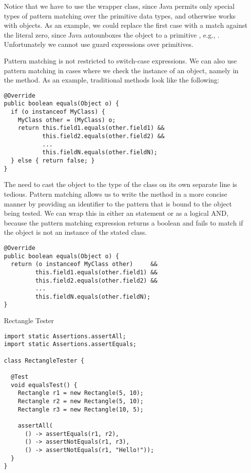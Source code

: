 Notice that we have to use the wrapper class, since Java permits only special types of pattern matching over the primitive data types, and otherwise works with objects. As an example, we could replace the first case with a match against the literal zero, since Java autounboxes the  object to a primitive , e.g., . Unfortunately we cannot use guard expressions over primitives.

Pattern matching is not restricted to switch-case expressions. We can also use pattern matching in cases where we check the instance of an object, namely in the  method. As an example, traditional  methods look like the following:

\par{
\begin{verbatim}
@Override
public boolean equals(Object o) {
  if (o instanceof MyClass) {
    MyClass other = (MyClass) o;
    return this.field1.equals(other.field1) &&
           this.field2.equals(other.field2) &&
           ...
           this.fieldN.equals(other.fieldN);
  } else { return false; }
}
\end{verbatim}
}

The need to cast the object to the type of the class on its own separate line is tedious. Pattern matching allows us to write the  method in a more concise manner by providing an identifier to the pattern that is bound to the object being tested. We can wrap this in either an  statement or as a logical AND, because the pattern matching expression returns a boolean and fails to match if the object is not an instance of the stated class.

\par{
\begin{verbatim}
@Override
public boolean equals(Object o) {
  return (o instanceof MyClass other)     &&
         this.field1.equals(other.field1) &&
         this.field2.equals(other.field2) &&
         ...
         this.fieldN.equals(other.fieldN);
}
\end{verbatim}
}


\begin{cl}{Rectangle Tester}
\begin{lstlisting}[language=MyJava]
import static Assertions.assertAll;
import static Assertions.assertEquals;

class RectangleTester {

  @Test
  void equalsTest() {
    Rectangle r1 = new Rectangle(5, 10);
    Rectangle r2 = new Rectangle(5, 10);
    Rectangle r3 = new Rectangle(10, 5);

    assertAll(
      () -> assertEquals(r1, r2),
      () -> assertNotEquals(r1, r3),
      () -> assertNotEquals(r1, "Hello!"));
  }
}
\end{lstlisting}
\end{cl}

